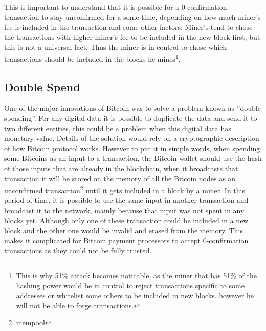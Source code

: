This is important to understand that it is possible for a 0-confirmation transaction to stay unconfirmed for a some time, depending on how much miner's fee is included in the transaction and some other factors. Miner's tend to chose the transactions with higher miner's fee to be included in the new block first, but this is not a universal fact. Thus the miner is in control to chose which transactions should be included in the blocks he mines\footnote{This is why 51\% attack becomes noticable, as the miner that has 51\% of the hashing power would be in control to reject transactions specific to some addresses or whitelist some others to be included in new blocks. however he will not be able to forge transactions.}.

\subsection{Double Spend}
One of the major innovations of Bitcoin was to solve a problem known as ''double spending''. For any digital data it is possible to duplicate the data and send it to two different entities, this could be a problem when this digital data has monetary value. Details of the solution would rely on a cryptographic description of how Bitcoin protocol works. However to put it in simple words, when spending some Bitcoins as an input to a transaction, the Bitcoin wallet should use the hash of those inputs that are already in the blockchain, when it broadcasts that transaction it will be stored on the memory of all the Bitcoin nodes as an unconfirmed transaction\footnote{mempool} until it gets included in a block by a miner. In this period of time, it is possible to use the same input in another transaction and broadcast it to the network, mainly because that input was not spent in any blocks yet. Although only one of these transaction could be included in a new block and the other one would be invalid and erased from the memory. This makes it complicated for Bitcoin payment processors to accept 0-confirmation transactions as they could not be fully trusted. 



